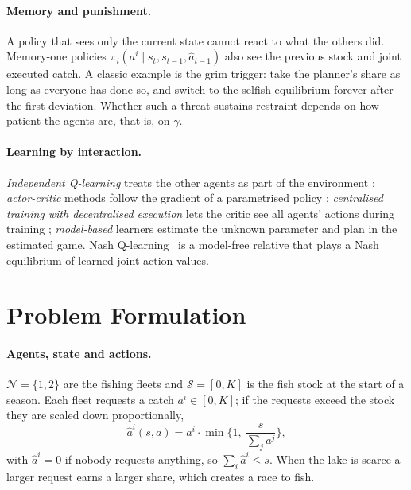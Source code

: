 \documentclass{article}
\begin{document}
\paragraph{Memory and punishment.} A policy that sees only the current state cannot react to what the others did. Memory-one policies $\pi_i(a^i\mid s_t,s_{t-1},\hat a_{t-1})$ also see the previous stock and joint executed catch. A classic example is the grim trigger: take the planner's share as long as everyone has done so, and switch to the selfish equilibrium forever after the first deviation. Whether such a threat sustains restraint depends on how patient the agents are, that is, on $\gamma$.

\paragraph{Learning by interaction.} \emph{Independent Q-learning} treats the other agents as part of the environment \cite{tan1993,watkins1992}; \emph{actor-critic} methods follow the gradient of a parametrised policy \cite{sutton2018}; \emph{centralised training with decentralised execution} lets the critic see all agents' actions during training \cite{lowe2017}; \emph{model-based} learners estimate the unknown parameter and plan in the estimated game. Nash Q-learning~\cite{hu2003} is a model-free relative that plays a Nash equilibrium of learned joint-action values.

\section{Problem Formulation}
\label{sec:formulation}
\paragraph{Agents, state and actions.} $\mathcal N=\{1,2\}$ are the fishing fleets and $\mathcal S=[0,K]$ is the fish stock at the start of a season. Each fleet requests a catch $a^i\in[0,K]$; if the requests exceed the stock they are scaled down proportionally,
\begin{equation}
\hat a^i(s,a)=a^i\cdot\min\Big\{1,\ \frac{s}{\sum_j a^j}\Big\},
\end{equation}
with $\hat a^i=0$ if nobody requests anything, so $\sum_i\hat a^i\le s$. When the lake is scarce a larger request earns a larger share, which creates a race to fish.
\end{document}
